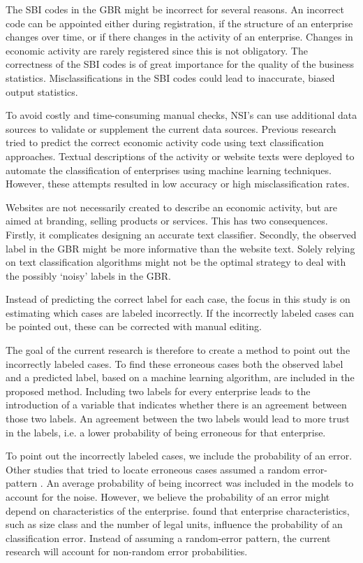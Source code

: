 \documentclass[12pt, a4paper, titlepage]{article}
\begin{document}
The SBI codes in the GBR might be incorrect for several reasons. An incorrect code can be appointed either during registration, if the structure of an enterprise changes over time, or if there changes in the activity of an enterprise. Changes in economic activity are rarely registered \citep{Christensen2008, DeldenScholtusBurger} since this is not obligatory. The correctness of the SBI codes is of great importance for the quality of the business statistics. Misclassifications in the SBI codes could lead to inaccurate, biased output statistics.

To avoid costly and time-consuming manual checks, NSI’s can use additional data sources to validate or supplement the current data sources. Previous research tried to predict the correct economic activity code using text classification approaches. Textual descriptions of the activity \citep{Caterini} or website texts \citep{Roelands, Berardi, Heidi} were deployed to automate the classification of enterprises using machine learning techniques. However, these attempts resulted in low accuracy or high misclassification rates. 

Websites are not necessarily created to describe an economic activity, but are aimed at branding, selling products or services. This has two consequences. Firstly, it complicates designing an accurate text classifier. Secondly, the observed label in the GBR might be more informative than the website text. Solely relying on text classification algorithms might not be the optimal strategy to deal with the possibly ‘noisy’ labels in the GBR.

Instead of predicting the correct label for each case, the focus in this study is on estimating which cases are labeled incorrectly. If the incorrectly labeled cases can be pointed out, these can be corrected with manual editing. 

The goal of the current research is therefore to create a method to point out the incorrectly labeled cases. To find these erroneous cases both the observed label and a predicted label, based on a machine learning algorithm, are included in the proposed method. Including two labels for every enterprise leads to the introduction of a variable that indicates whether there is an agreement between those two labels. An agreement between the two labels would lead to more trust in the labels, i.e. a lower probability of being erroneous for that enterprise.

To point out the incorrectly labeled cases, we include the probability of an error. Other studies that tried to locate erroneous cases assumed a random error-pattern \citep{Sigurdsson,Eskin,DiZio}. An average probability of being incorrect was included in the models to account for the noise. However, we believe the probability of an error might depend on characteristics of the enterprise. \citet{DeldenScholtusBurger} found that enterprise characteristics, such as size class and the number of legal units, influence the probability of an classification error. Instead of assuming a random-error pattern, the current research will account for non-random error probabilities.
\end{document}
